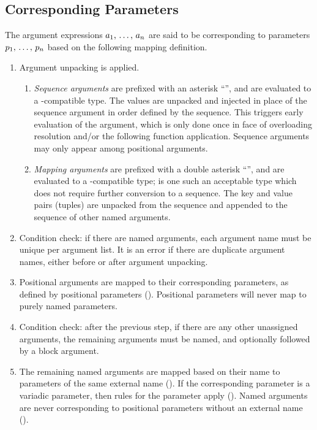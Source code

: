 \subsection{Corresponding Parameters}
\label{sec:corresponding-parameters}

The argument expressions $a_1 ,\, \ldots ,\, a_n$ are said to be corresponding to parameters $p_1 ,\, \ldots ,\, p_n$ based on the following mapping definition. 

\begin{enumerate}
  \item Argument unpacking is applied. 
    \begin{enumerate}
      \item {\em Sequence arguments} are prefixed with an asterisk ``\code{*}'', and are evaluated to a -compatible type. The values are unpacked and injected in place of the sequence argument in order defined by the sequence. This triggers early evaluation of the argument, which is only done once in face of overloading resolution and/or the following function application. Sequence arguments may only appear among positional arguments. 
      \item {\em Mapping arguments} are prefixed with a double asterisk ``\code{**}'', and are evaluated to a -compatible type;  is one such an acceptable type which does not require further conversion to a sequence. The key and value pairs (tuples) are unpacked from the sequence and appended to the sequence of other named arguments. 
    \end{enumerate}
    
  \item Condition check: if there are named arguments, each argument name must be unique per argument list. It is an error if there are duplicate argument names, either before or after argument unpacking.
    
  \item Positional arguments are mapped to their corresponding parameters, as defined by positional parameters (). Positional parameters will never map to purely named parameters. 
  
  \item Condition check: after the previous step, if there are any other unassigned arguments, the remaining arguments must be named, and optionally followed by a block argument. 
  
  \item The remaining named arguments are mapped based on their name to parameters of the same external name (). If the corresponding parameter is a variadic parameter, then rules for the parameter apply (). Named arguments are never corresponding to positional parameters without an external name (). 
  

\end{enumerate}
